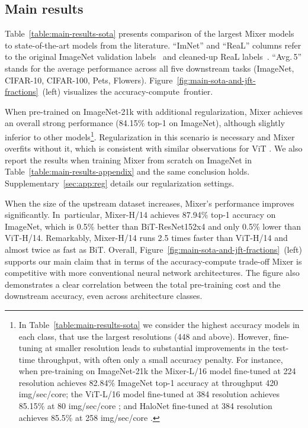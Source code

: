 \documentclass{article}
\newcommand{\name}{Mixer}
\begin{document}
\subsection{Main results}
Table~\ref{table:main-results-sota} presents comparison of the largest \name{} models to state-of-the-art models from the literature.
``ImNet'' and ``ReaL'' columns refer to the original ImageNet validation labels~\citep{deng2009-imagenet} and cleaned-up ReaL labels~\citep{beyer2020-imagenet}.
``Avg.\,5'' stands for the average performance across all five downstream tasks (ImageNet, CIFAR-10, CIFAR-100, Pets, Flowers).
Figure~\ref{fig:main-sota-and-jft-fractions}~(left) visualizes the accuracy-compute~frontier.

When pre-trained on ImageNet-21k with additional regularization, \name{} achieves an overall strong performance (84.15\% top-1 on ImageNet), although slightly inferior to other models\footnote{
In Table~\ref{table:main-results-sota} we consider the highest accuracy models in each class, that use the largest resolutions (448 and above).
However, fine-tuning at smaller resolution leads to substantial improvements in the test-time throughput, with often only a small accuracy penalty.
For instance, when pre-training on ImageNet-21k
the \name{}-L/16 model fine-tuned at 224 resolution achieves 82.84\% ImageNet top-1 accuracy at throughput 420 img/sec/core;
the ViT-L/16 model fine-tuned at 384 resolution achieves 85.15\% at 80 img/sec/core \cite{Dosovitskiy2021};
and HaloNet fine-tuned at 384 resolution achieves 85.5\% at 258 img/sec/core \cite{vaswani2021scaling}.
}.
Regularization in this scenario is necessary and \name{} overfits without it, which is consistent with similar observations for ViT \cite{Dosovitskiy2021}.
We also report the results when training \name{} from scratch on ImageNet in Table~\ref{table:main-results-appendix} and the same conclusion holds.
Supplementary~\ref{sec:app:reg} details our regularization settings.

When the size of the upstream dataset increases, \name{}'s performance improves significantly.
In~particular, \name{}-H/14 achieves 87.94\% top-1 accuracy on ImageNet, which is 0.5\% better than BiT-ResNet152x4 and only 0.5\% lower than ViT-H/14.
Remarkably, \name{}-H/14 runs 2.5 times faster than ViT-H/14 and almost twice as fast as BiT. 
Overall, Figure~\ref{fig:main-sota-and-jft-fractions}~(left) supports our main claim that in terms of the accuracy-compute trade-off \name{} is competitive with more conventional neural network architectures. The figure also demonstrates a clear correlation between the total pre-training cost and the downstream accuracy, even across architecture classes.
\end{document}
